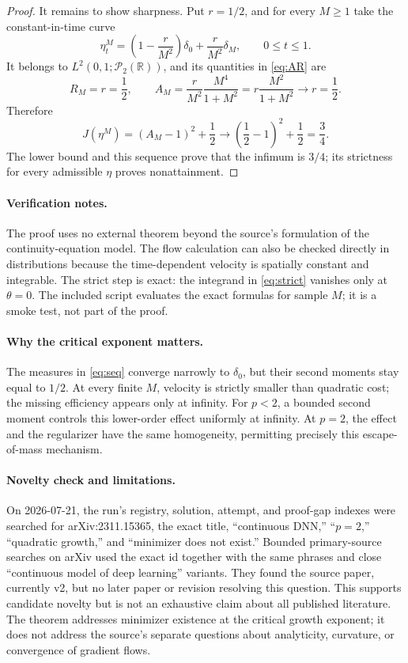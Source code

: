 \documentclass[11pt]{article}
\newcommand{\R}{\mathbb R}
\newcommand{\Ptwo}{\mathcal P_2}
\begin{document}
\begin{proof}
It remains to show sharpness. Put \(r=1/2\), and for every \(M\geq1\) take
the constant-in-time curve
\begin{equation}\label{eq:seq}
 \eta_t^M=\left(1-\frac{r}{M^2}\right)\delta_0
 +\frac{r}{M^2}\delta_M,
 \qquad 0\leq t\leq1.
\end{equation}
It belongs to \(L^2(0,1;\Ptwo(\R))\), and its quantities in
\eqref{eq:AR} are
\[
 R_M=r=\frac12,
 \qquad
 A_M=\frac{r}{M^2}\frac{M^4}{1+M^2}
 =r\frac{M^2}{1+M^2}\longrightarrow r=\frac12.
\]
Therefore
\[
 J(\eta^M)=(A_M-1)^2+\frac12\longrightarrow
 \left(\frac12-1\right)^2+\frac12=\frac34.
\]
The lower bound and this sequence prove that the infimum is \(3/4\); its
strictness for every admissible \(\eta\) proves nonattainment.
\end{proof}

\paragraph{Verification notes.}
The proof uses no external theorem beyond the source's formulation of the
continuity-equation model. The flow calculation can also be checked directly
in distributions because the time-dependent velocity is spatially constant
and integrable. The strict step is exact: the integrand in
\eqref{eq:strict} vanishes only at \(\theta=0\). The included script evaluates
the exact formulas for sample \(M\); it is a smoke test, not part of the proof.

\paragraph{Why the critical exponent matters.}
The measures in \eqref{eq:seq} converge narrowly to \(\delta_0\), but their
second moments stay equal to \(1/2\). At every finite \(M\), velocity is
strictly smaller than quadratic cost; the missing efficiency appears only at
infinity. For \(p<2\), a bounded second moment controls this lower-order
effect uniformly at infinity. At \(p=2\), the effect and the regularizer have
the same homogeneity, permitting precisely this escape-of-mass mechanism.

\paragraph{Novelty check and limitations.}
On 2026-07-21, the run's registry, solution, attempt, and proof-gap indexes
were searched for arXiv:2311.15365, the exact title, ``continuous DNN,''
``\(p=2\),'' ``quadratic growth,'' and ``minimizer does not exist.'' Bounded
primary-source searches on arXiv used the exact id together with the same
phrases and close ``continuous model of deep learning'' variants. They found
the source paper, currently v2, but no later paper or revision resolving this
question. This supports candidate novelty but is not an exhaustive claim
about all published literature. The theorem addresses minimizer existence at
the critical growth exponent; it does not address the source's separate
questions about analyticity, curvature, or convergence of gradient flows.
\end{document}
